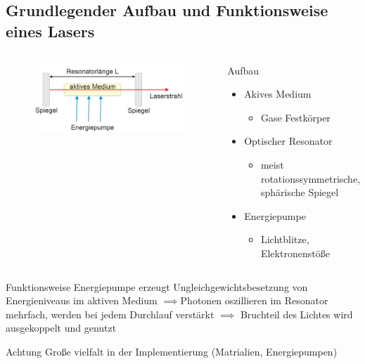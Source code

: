 \documentclass[10pt, aspectratio=169]{beamer}
\begin{document}
\subsection{Grundlegender Aufbau und Funktionsweise eines Lasers}
\label{sec:funkt}
\begin{frame}
  \begin{columns}
    \begin{figure}[H]\centering
      \includegraphics[width=\columnwidth]{schema.png}
    \end{figure}

    \begin{block}{Aufbau}
      \begin{itemize}
      \item Akives Medium
        \begin{itemize}
        \item Gase Festk\"orper
        \end{itemize}
      \item Optischer Resonator
        \begin{itemize}
        \item meist rotationssymmetrische, sph\"arische Spiegel
        \end{itemize}
      \item Energiepumpe
        \begin{itemize}
        \item Lichtblitze, Elektronenst\"oße
        \end{itemize}
      \end{itemize}
    \end{block}
  \end{columns}
\end{frame}

\begin{frame}{Funktionsweise}
  Energiepumpe erzeugt Ungleichgewichtsbesetzung von Energieniveaus im
  aktiven Medium \(\implies\)\pause Photonen oszillieren im Resonator
  mehrfach, werden bei jedem Durchlauf verst\"arkt \(\implies\)\pause
  Bruchteil des Lichtes wird ausgekoppelt und genutzt


  \pause
  \begin{alertblock}{Achtung}
    Gro\ss{}e vielfalt in der Implementierung (Matrialien,
    Energiepumpen)
  \end{alertblock}
\end{frame}
\end{document}

